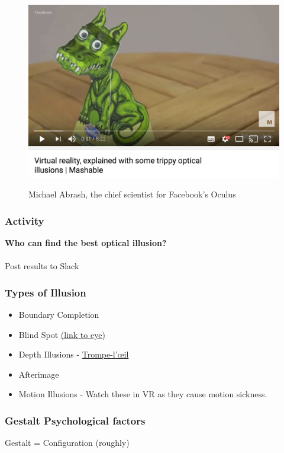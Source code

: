 \begin{frame}
	\begin{figure}
		\href{https://www.youtube.com/watch?v=qD3w3cAhEYU}{ \includegraphics[scale=.4]{assets/optical}  }
		\caption{Michael Abrash, the chief scientist for Facebook's Oculus}
	\end{figure}
\end{frame}

\begin{frame}
	\frametitle{Activity}
	\textbf{Who can find the best optical illusion?} \\~\\
	
	Post results to Slack
	
\end{frame}

\begin{frame}
	\frametitle{Types of Illusion}
	\begin{itemize}
		\item Boundary Completion
		\item Blind Spot \href{http://snowbrains.com/wp-content/uploads/2013/07/eyeball.jpg}{ (link to eye)}
		\item Depth Illusions - \href{https://www.youtube.com/watch?v=QmMTwjUdqbg}{Trompe-l'\oe il}
		\item Afterimage
		\item Motion Illusions - Watch these in VR as they cause motion sickness. 
	\end{itemize}
\end{frame}

\begin{frame}
	\frametitle{Gestalt Psychological factors}
	Gestalt = Configuration (roughly)
\end{frame}

